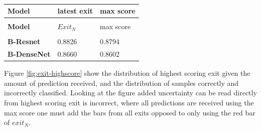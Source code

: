 \begin{longtabu}{>{\bfseries}X|X|X}
	\caption[]{} \label{tbl:latest-vs-max} \\
	\toprule
	\rowfont{\bfseries}
	Model & latest exit & max score   \tabularnewline
	\bottomrule
	\endfirsthead
	\\
	\toprule
	\rowfont{\bfseries}
	Model & $Exit_N$ & max score    \tabularnewline
	\bottomrule
	\endhead %
	\bottomrule
	\\
	\endfoot
	\hline
	\endlastfoot
	B-Resnet	& 0.8826	& 0.8794  \tabularnewline
	\hline
	B-DenseNet	& 0.8660 	& 0.8602 \tabularnewline 								
	\bottomrule
\end{longtabu}
Figure \ref{fig:exit-highscore} show the distribution of highest scoring exit given the amount of prediction received, and the distribution of samples correctly and incorrectly classified. Looking at the figure added uncertainty can be read directly from highest scoring exit is incorrect, where all predictions are received using the max score one must add the bars from all exits opposed to only using the red bar of $exit_N$. 


